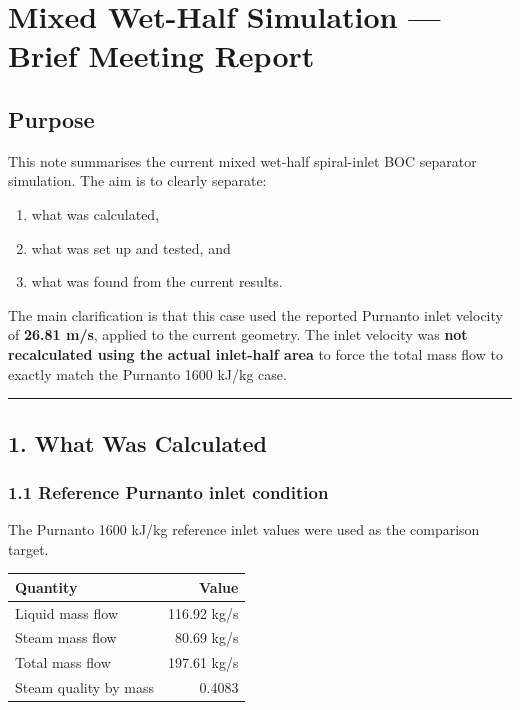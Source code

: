 \documentclass[
  11pt,
]{article}
\author{}
\date{}
\newcounter{none} %
\providecommand{\tightlist}{%
  \setlength{\itemsep}{0pt}\setlength{\parskip}{0pt}}
\begin{document}
\section{Mixed Wet-Half Simulation --- Brief Meeting
Report}\label{mixed-wet-half-simulation-brief-meeting-report}

\subsection{Purpose}\label{purpose}

This note summarises the current mixed wet-half spiral-inlet BOC
separator simulation. The aim is to clearly separate:

\begin{enumerate}
\def\labelenumi{\arabic{enumi}.}
\tightlist
\item
  what was calculated,
\item
  what was set up and tested, and
\item
  what was found from the current results.
\end{enumerate}

The main clarification is that this case used the reported Purnanto
inlet velocity of \textbf{26.81 m/s}, applied to the current geometry.
The inlet velocity was \textbf{not recalculated using the actual
inlet-half area} to force the total mass flow to exactly match the
Purnanto 1600 kJ/kg case.

\begin{center}\rule{0.5\linewidth}{0.5pt}\end{center}

\subsection{1. What Was Calculated}\label{what-was-calculated}

\subsubsection{1.1 Reference Purnanto inlet
condition}\label{reference-purnanto-inlet-condition}

The Purnanto 1600 kJ/kg reference inlet values were used as the
comparison target.

{\def\LTcaptype{none} %
\begin{longtable}[]{@{}lr@{}}
\toprule\noalign{}
Quantity & Value \\
\midrule\noalign{}
\endhead
\bottomrule\noalign{}
\endlastfoot
Liquid mass flow & 116.92 kg/s \\
Steam mass flow & 80.69 kg/s \\
Total mass flow & 197.61 kg/s \\
Steam quality by mass & 0.4083 \\
\end{longtable}
}
\end{document}

